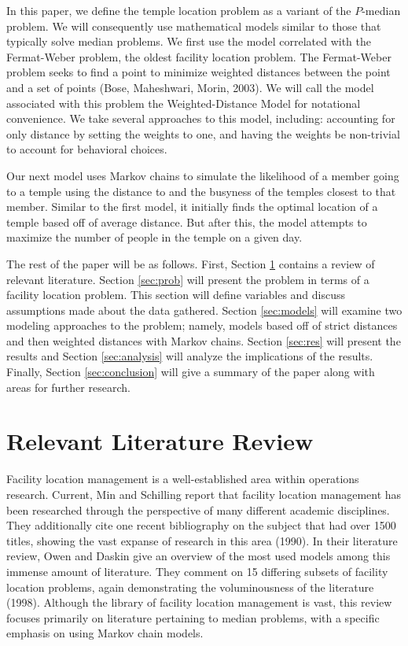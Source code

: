 \documentclass[twoside,twocolumn]{article}
\begin{document}
In this paper, we define the temple location problem as a variant of the $P$-median problem.
We will consequently use mathematical models similar to those that typically solve median problems.
We first use the model correlated with the Fermat-Weber problem, the oldest facility location problem.
The Fermat-Weber problem seeks to find a point to minimize weighted distances between the point and a set of points (Bose, Maheshwari, Morin, 2003).
We will call the model associated with this problem the Weighted-Distance Model for notational convenience.
We take several approaches to this model, including: accounting for only distance by setting the weights to one, and having the weights be non-trivial to account for behavioral choices.

Our next model uses Markov chains to simulate the likelihood of a member going to a temple using the distance to and the busyness of the temples closest to that member.
Similar to the first model, it initially finds the optimal location of a temple based off of average distance.
But after this, the model attempts to maximize the number of people in the temple on a given day.

The rest of the paper will be as follows.
First, Section \ref{sec:litrev} contains a review of relevant literature.
Section \ref{sec:prob} will present the problem in terms of a facility location problem.
This section will define variables and discuss assumptions made about the data gathered.
Section \ref{sec:models} will examine two modeling approaches to the problem; namely, models based off of strict distances and then weighted distances with Markov chains.
Section \ref{sec:res} will present the results and Section \ref{sec:analysis} will analyze the implications of the results.
Finally, Section \ref{sec:conclusion} will give a summary of the paper along with areas for further research.

\section{Relevant Literature Review}
\label{sec:litrev}

Facility location management is a well-established area within operations research.
Current, Min and Schilling report that facility location management has been researched through the perspective of many different academic disciplines.
They additionally cite one recent bibliography on the subject that had over 1500 titles, showing the vast expanse of research in this area (1990).
In their literature review, Owen and Daskin give an overview of the most used models among this immense amount of literature. 
They comment on 15 differing subsets of facility location problems, again demonstrating the voluminousness of the literature (1998).
Although the library of facility location management is vast, this review focuses primarily on literature pertaining to median problems, with a specific emphasis on using Markov chain models.
\end{document}
